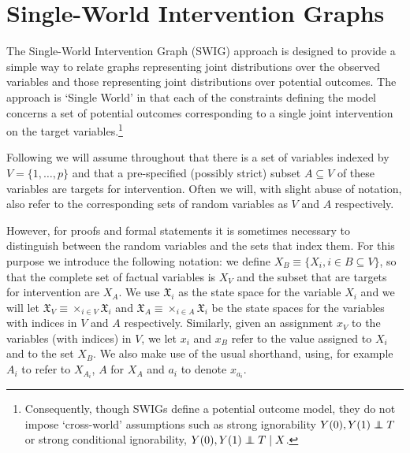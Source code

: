 \documentclass[11pt]{article}
\newcommand\indep{\protect\mathpalette{\protect\independenT}{\perp}}
\def\independenT#1#2{\mathrel{\rlap{$#1#2$}\mkern2.5mu{#1#2}}}
\begin{document}
\section{Single-World Intervention Graphs}\label{sec:swigs}

The Single-World Intervention Graph (SWIG) approach is designed to provide a simple way to relate graphs representing joint distributions over the observed variables and those representing joint distributions over potential outcomes. The approach is `Single World' in that each of the constraints defining the model concerns a set of potential outcomes corresponding to a single joint intervention on the target variables.\footnote{Consequently, though SWIGs define a potential outcome model, they do not impose `cross-world' assumptions such as strong ignorability $Y(0),Y(1) \indep T$ or strong conditional ignorability, $Y(0),Y(1) \indep T \mid X$.}

Following \citep{robins86new,thomas13swig} we will assume throughout that there is a set of variables indexed by $V=\{1,\ldots , p\}$ and that a pre-specified (possibly strict)  subset $A \subseteq V$ of these variables are targets for intervention. Often we will, with slight abuse of notation, also refer to the corresponding sets of random variables as $V$ and $A$ respectively.

However, for proofs and formal statements it is sometimes necessary to distinguish between the random variables and the sets that index them. For this purpose we introduce the following notation: we define $X_B \equiv \{X_i, i \in B \subseteq V\}$, so that the complete set of factual variables is $X_V$ and the subset that are targets for intervention are $X_A$. We use $\mathfrak{X}_{i}$ as the state space for the variable $X_i$ and we will let  $\mathfrak{X}_V \equiv \times_{i \in V} \mathfrak{X}_{i}$  and $\mathfrak{X}_A \equiv \times_{i \in A} \mathfrak{X}_{i}$ be the state spaces for the variables with indices in $V$ and $A$ respectively. Similarly, given an assignment $x_V$ to the variables (with indices) in $V$, we let $x_i$ and $x_B$ refer to the value assigned to $X_i$ and to the set $X_B$. We also make use of the usual shorthand, using, for example $A_i$ to refer to $X_{A_i}$, $A$ for $X_A$  and $a_i$ to denote $x_{a_i}$.
\end{document}
